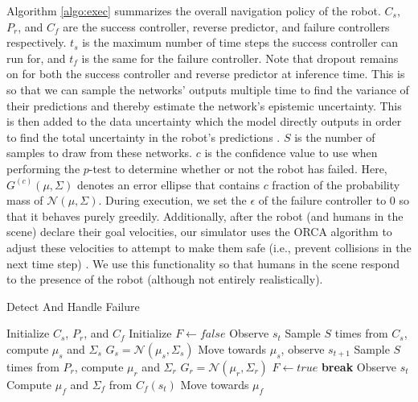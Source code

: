 \documentclass[letterpaper, 10 pt, conference]{ieeeconf}  %
\begin{document}
		Algorithm \ref{algo:exec} summarizes the overall navigation policy of the robot. $C_s$, $P_r$, and $C_f$ are the success controller, reverse predictor, and failure controllers respectively. $t_s$ is the maximum number of time steps the success controller can run for, and $t_f$ is the same for the failure controller. Note that dropout remains on for both the success controller and reverse predictor at inference time. This is so that we can sample the networks' outputs multiple time to find the variance of their predictions and thereby estimate the network's epistemic uncertainty. This is then added to the data uncertainty which the model directly outputs in order to find the total uncertainty in the robot's predictions \cite{gal2016uncertainty}. $S$ is the number of samples to draw from these networks. $c$ is the confidence value to use when performing the $p$-test to determine whether or not the robot has failed. Here, $G^{(c)}(\mu, \Sigma)$ denotes an error ellipse that contains $c$ fraction of the probability mass of $\mathcal{N}(\mu, \Sigma)$. During execution, we set the $\epsilon$ of the failure controller to $0$ so that it behaves purely greedily. Additionally, after the robot (and humans in the scene) declare their goal velocities, our simulator uses the ORCA algorithm to adjust these velocities to attempt to make them safe (i.e., prevent collisions in the next time step) \cite{orca}. We use this functionality so that humans in the scene respond to the presence of the robot (although not entirely realistically).
		
		\begin{algorithm}
			\caption{Detect And Handle Failure}
			\label{algo:exec}
			\begin{algorithmic}
					\State Initialize $C_s$, $P_r$, and $C_f$
					\State Initialize $F\leftarrow false$
						\State Observe $s_t$
						\State Sample $S$ times from $C_s$, compute $\mu_s$ and $\Sigma_s$
						\State $G_s = \mathcal{N}(\mu_s, \Sigma_s)$
						\State Move towards $\mu_s$, observe $s_{t+1}$
						\State Sample $S$ times from $P_r$, compute $\mu_r$ and $\Sigma_r$
						\State $G_r = \mathcal{N}(\mu_r, \Sigma_r)$
							\State $F\leftarrow true$
							\State \textbf{break}
						\EndIf
					\EndFor
							\State Observe $s_t$
							\State Compute $\mu_f$ and $\Sigma_f$ from $C_f(s_t)$
							\State Move towards $\mu_f$
						\EndFor
					\EndIf
				\EndFunction
			\end{algorithmic}
		\end{algorithm}
		
\end{document}
